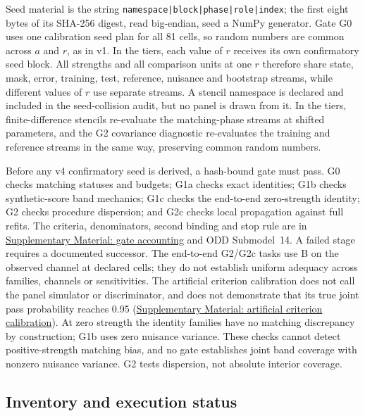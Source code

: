 Seed material is the string \texttt{namespace|block|phase|role|index}; the first eight bytes of its SHA-256 digest, read big-endian, seed a NumPy generator. %
Gate G0 uses one calibration seed plan for all 81 cells, so random numbers are common across $a$ and $r$, as in v1. %
In the tiers, each value of $r$ receives its own confirmatory seed block. %
All strengths and all comparison units at one $r$ therefore share state, mask, error, training, test, reference, nuisance and bootstrap streams, while different values of $r$ use separate streams. %
A stencil namespace is declared and included in the seed-collision audit, but no panel is drawn from it. In the tiers, finite-difference stencils re-evaluate the matching-phase streams at shifted parameters, and the G2 covariance diagnostic re-evaluates the training and reference streams in the same way, preserving common random numbers. %

Before any v4 confirmatory seed is derived, a hash-bound gate must pass. G0 checks matching statuses and budgets; G1a checks exact identities; G1b checks synthetic-score band mechanics; G1c checks the end-to-end zero-strength identity; G2 checks procedure dispersion; and G2c checks local propagation against full refits. The criteria, denominators, second binding and stop rule are in \hyperref[supp:gate-accounting]{Supplementary Material: gate accounting} and ODD Submodel~14. A failed stage requires a documented successor. %
The end-to-end G2/G2c tasks use B on the observed channel at declared cells; they do not establish uniform adequacy across families, channels or sensitivities. %
The artificial criterion calibration does not call the panel simulator or discriminator, and does not demonstrate that its true joint pass probability reaches 0.95 (\hyperref[supp:gate-calibration]{Supplementary Material: artificial criterion calibration}). %
At zero strength the identity families have no matching discrepancy by construction; G1b uses zero nuisance variance. These checks cannot detect positive-strength matching bias, and no gate establishes joint band coverage with nonzero nuisance variance. G2 tests dispersion, not absolute interior coverage. %

\subsection{Inventory and execution status}

